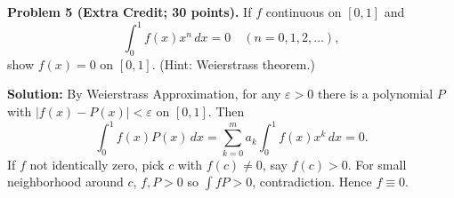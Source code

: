 \documentclass[12pt]{article}
\begin{document}
\medskip

\noindent\textbf{Problem 5 (Extra Credit; 30 points).} If $f$ continuous on $[0,1]$ and
\[
\int_0^1 f(x)x^n\,dx=0\quad(n=0,1,2,\dots),
\]
show $f(x)=0$ on $[0,1]$. (Hint: Weierstrass theorem.)

\medskip

\noindent\textbf{Solution:} By Weierstrass Approximation, for any $\varepsilon>0$ there is a polynomial $P$ with $|f(x)-P(x)|<\varepsilon$ on $[0,1]$. Then
\[
\int_0^1 f(x)P(x)\,dx
=\sum_{k=0}^m a_k\int_0^1 f(x)x^k\,dx =0.
\]
If $f$ not identically zero, pick $c$ with $f(c)\ne0$, say $f(c)>0$. For small neighborhood around $c$, $f,P>0$ so $\int fP>0$, contradiction. Hence $f\equiv0$.
\end{document}

